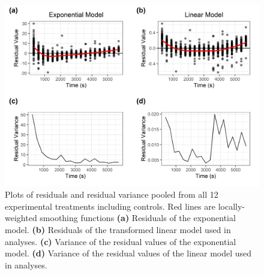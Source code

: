 \documentclass[geosciences,article,submit,moreauthors,pdftex]{Definitions/mdpi}
\begin{document}
\begin{figure}[H]
\centering
\includegraphics[width=5.5in]{../pics/heterosked.png}
\caption{Plots of residuals and residual variance pooled from all 12 experimental treatments including controls. Red lines are locally-weighted smoothing functions \textbf{(a)} Residuals of the exponential model. \textbf{(b)} Residuals of the transformed linear model used in analyses. \textbf{(c)} Variance of the residual values of the exponential model. \textbf{(d)} Variance of the residual values of the linear model used in analyses.}
\label{fig:heterosked}
\end{figure}



\end{document}
